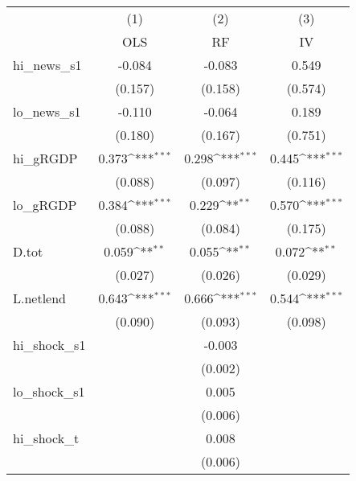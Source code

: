 {
\def\sym#1{\ifmmode^{#1}\else\(^{#1}\)\fi}
\begin{tabular}{l*{3}{c}}
\toprule
            &\multicolumn{1}{c}{(1)}&\multicolumn{1}{c}{(2)}&\multicolumn{1}{c}{(3)}\\
            &\multicolumn{1}{c}{OLS}&\multicolumn{1}{c}{RF}&\multicolumn{1}{c}{IV}\\
\midrule
hi\_news\_s1  &      -0.084         &      -0.083         &       0.549         \\
            &     (0.157)         &     (0.158)         &     (0.574)         \\
\addlinespace
lo\_news\_s1  &      -0.110         &      -0.064         &       0.189         \\
            &     (0.180)         &     (0.167)         &     (0.751)         \\
\addlinespace
hi\_gRGDP    &       0.373\sym{***}&       0.298\sym{***}&       0.445\sym{***}\\
            &     (0.088)         &     (0.097)         &     (0.116)         \\
\addlinespace
lo\_gRGDP    &       0.384\sym{***}&       0.229\sym{**} &       0.570\sym{***}\\
            &     (0.088)         &     (0.084)         &     (0.175)         \\
\addlinespace
D.tot       &       0.059\sym{**} &       0.055\sym{**} &       0.072\sym{**} \\
            &     (0.027)         &     (0.026)         &     (0.029)         \\
\addlinespace
L.netlend   &       0.643\sym{***}&       0.666\sym{***}&       0.544\sym{***}\\
            &     (0.090)         &     (0.093)         &     (0.098)         \\
\addlinespace
hi\_shock\_s1 &                     &      -0.003         &                     \\
            &                     &     (0.002)         &                     \\
\addlinespace
lo\_shock\_s1 &                     &       0.005         &                     \\
            &                     &     (0.006)         &                     \\
\addlinespace
hi\_shock\_t  &                     &       0.008         &                     \\
            &                     &     (0.006)         &                     \\

\end{tabular}}
